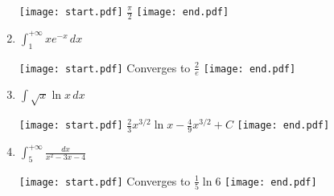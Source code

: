 \documentclass[12pt]{article}
\begin{document}
\begin{enumerate}
\texttt{[image: start.pdf]}
{{$\frac{\pi}{2}$}}
\texttt{[image: end.pdf]}


\item $\int_1^{+\infty} xe^{-x} \,dx$

\texttt{[image: start.pdf]}
{{Converges to $\frac{2}{e}$}}
\texttt{[image: end.pdf]}


\item $\int \sqrt{x}\ln{x} \,dx$

\texttt{[image: start.pdf]}
{{$\frac{2}{3}x^{3/2}\ln{x}-\frac{4}{9}x^{3/2}+C$}}
\texttt{[image: end.pdf]}


\item $\int_5^{+\infty} \frac{dx}{x^2-3x-4}$

\texttt{[image: start.pdf]}
{{Converges to $\frac{1}{5}\ln{6}$}}
\texttt{[image: end.pdf]}


\end{enumerate}
\end{document}
